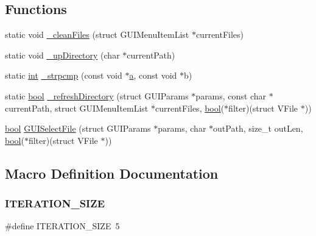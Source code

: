 \subsection*{Functions}
\begin{DoxyCompactItemize}
\item 
static void \mbox{\hyperlink{file-select_8c_a9270d5f5d4df7b53e1c337065ddf44bf}{\+\_\+clean\+Files}} (struct G\+U\+I\+Menu\+Item\+List $\ast$current\+Files)
\item 
static void \mbox{\hyperlink{file-select_8c_a52fbed7d72ffed083d8277f5070ad33d}{\+\_\+up\+Directory}} (char $\ast$current\+Path)
\item 
static \mbox{\hyperlink{ioapi_8h_a787fa3cf048117ba7123753c1e74fcd6}{int}} \mbox{\hyperlink{file-select_8c_aac23dd0c263192be4391a136d2d31d9a}{\+\_\+strpcmp}} (const void $\ast$\mbox{\hyperlink{isa-lr35902_8c_a7015284d2957ab7cdf82d2535a2fa547}{a}}, const void $\ast$b)
\item 
static \mbox{\hyperlink{libretro_8h_a4a26dcae73fb7e1528214a068aca317e}{bool}} \mbox{\hyperlink{file-select_8c_ad8e0bb9d5b8355bc27bdc9a55dcc2e75}{\+\_\+refresh\+Directory}} (struct G\+U\+I\+Params $\ast$params, const char $\ast$current\+Path, struct G\+U\+I\+Menu\+Item\+List $\ast$current\+Files, \mbox{\hyperlink{libretro_8h_a4a26dcae73fb7e1528214a068aca317e}{bool}}($\ast$filter)(struct V\+File $\ast$))
\item 
\mbox{\hyperlink{libretro_8h_a4a26dcae73fb7e1528214a068aca317e}{bool}} \mbox{\hyperlink{file-select_8c_a8ad8aec85f35dc0c7d53e825447c3fcb}{G\+U\+I\+Select\+File}} (struct G\+U\+I\+Params $\ast$params, char $\ast$out\+Path, size\+\_\+t out\+Len, \mbox{\hyperlink{libretro_8h_a4a26dcae73fb7e1528214a068aca317e}{bool}}($\ast$filter)(struct V\+File $\ast$))
\end{DoxyCompactItemize}


\subsection{Macro Definition Documentation}
\mbox{\label{file-select_8c_a3ad638821db1c150fa4ecda36a1dda01}} 
\subsubsection{\texorpdfstring{I\+T\+E\+R\+A\+T\+I\+O\+N\+\_\+\+S\+I\+ZE}{ITERATION\_SIZE}}
{\footnotesize\ttfamily \#define I\+T\+E\+R\+A\+T\+I\+O\+N\+\_\+\+S\+I\+ZE~5}

